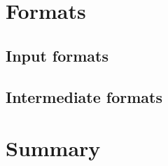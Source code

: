 \section{Formats}
\subsection{Input formats}

\subsection{Intermediate formats}


\section{Summary}

%
